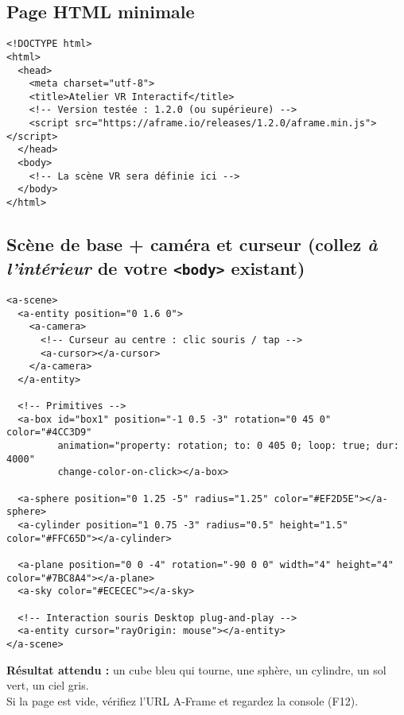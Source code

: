 \documentclass[12pt]{article}
\begin{document}
\subsection{Page HTML minimale}
\begin{verbatim}
<!DOCTYPE html>
<html>
  <head>
    <meta charset="utf-8">
    <title>Atelier VR Interactif</title>
    <!-- Version testée : 1.2.0 (ou supérieure) -->
    <script src="https://aframe.io/releases/1.2.0/aframe.min.js"></script>
  </head>
  <body>
    <!-- La scène VR sera définie ici -->
  </body>
</html>
\end{verbatim}

\subsection{Scène de base + caméra et curseur (collez \emph{à l'intérieur} de votre \texttt{<body>} existant)}
\begin{verbatim}
<a-scene>
  <a-entity position="0 1.6 0">
    <a-camera>
      <!-- Curseur au centre : clic souris / tap -->
      <a-cursor></a-cursor>
    </a-camera>
  </a-entity>

  <!-- Primitives -->
  <a-box id="box1" position="-1 0.5 -3" rotation="0 45 0" color="#4CC3D9"
         animation="property: rotation; to: 0 405 0; loop: true; dur: 4000"
         change-color-on-click></a-box>

  <a-sphere position="0 1.25 -5" radius="1.25" color="#EF2D5E"></a-sphere>
  <a-cylinder position="1 0.75 -3" radius="0.5" height="1.5" color="#FFC65D"></a-cylinder>

  <a-plane position="0 0 -4" rotation="-90 0 0" width="4" height="4" color="#7BC8A4"></a-plane>
  <a-sky color="#ECECEC"></a-sky>

  <!-- Interaction souris Desktop plug-and-play -->
  <a-entity cursor="rayOrigin: mouse"></a-entity>
</a-scene>
\end{verbatim}

\begin{checkpoint}
\textbf{Résultat attendu :} un cube bleu qui tourne, une sphère, un cylindre, un sol vert, un ciel gris.\\
Si la page est vide, vérifiez l’URL A-Frame et regardez la console (F12).
\end{checkpoint}
\end{document}
